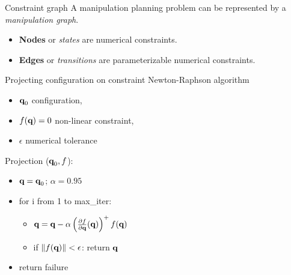 \begin {frame} {Constraint graph}
  A manipulation planning problem can be represented by a \textit{manipulation graph}.
  \begin {itemize}
    \item \textbf{Nodes} or \textit{states} are numerical constraints.
    \item \textbf{Edges} or \textit{transitions} are parameterizable numerical constraints.
  \end {itemize}
  \begin{center}
    \end{center}
\end {frame}

%
%

\begin {frame} {Projecting configuration on constraint}
  Newton-Raphson algorithm
  \begin {itemize}
  \item $\textbf{q}_0$ configuration,
  \item $f(\textbf{q}) = 0$ non-linear constraint,
  \item $\epsilon$ numerical tolerance
  \end {itemize}
  Projection ($\textbf{q}_0, f$):
  \begin{itemize}
    \item [] $\textbf{q} = \textbf{q}_0$; $\alpha = 0.95$
    \item [] for i from 1 to max\_iter:
      \begin {itemize}
      \item [] $\textbf{q} = \textbf{q} - \alpha \left(\frac {\partial f}{\partial \textbf{q}}(\textbf{q})\right)^{+} f (\textbf{q})$
      \item [] if $\|f(\textbf{q})\| < \epsilon$: return $\textbf{q}$
      \end {itemize}
    \item [] return failure
  \end{itemize}

\end {frame}

